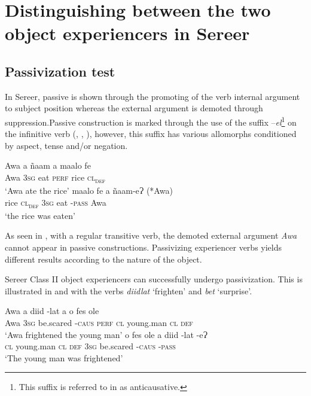 \documentclass[output=paper]{langscibook}
\begin{document}
\section{Distinguishing between the two object  experiencers in Sereer}
\label{sec:tamba:3}
\subsection{Passivization test}
\label{sec:tamba:3.1}

In Sereer, passive is shown through the promoting of the verb internal argument to subject position whereas the external argument is demoted through suppression.Passive construction is marked through the use of the suffix –\textit{el}\footnote{This suffix is referred to in \citet{FayeMous2006} as anticausative.} on the infinitive verb (\citealt{Faye1979}, \citealt{Renaudier2012}, \citealt{Faye2013}), however, this suffix has various allomorphs conditioned by aspect, tense and/or negation.

\ea \label{ex:tamba:8}
\ea \label{ex:tamba:8a}
\gll Awa   a       ñaam   a         maalo fe\\
Awa   3\textsc{sg}   eat      \textsc{perf}    rice     \textsc{cl\textsubscript{def}}\\
\glt `Awa ate the rice'
\ex \label{ex:tamba:8b}
\gll maalo fe     a      ñaam-eɁ       (*Awa)\\
rice    \textsc{cl\textsubscript{def}} 3\textsc{sg}  eat     {}-\textsc{pass}   Awa\\
\glt `the rice was eaten'
\z
\z

As seen in , with a regular transitive verb, the demoted external argument \textit{Awa}  cannot appear in passive constructions. Passivizing experiencer verbs yields different results according to the nature of the object. 

Sereer Class II object experiencers can successfully undergo passivization. This is illustrated in  and  with the verbs \textit{diidlat} ‘frighten’ and \textit{bet} ‘surprise’. 

\ea \label{ex:tamba:9}
\ea \label{ex:tamba:9a}
\gll Awa  a      diid         {}-lat    a       o    fes            ole\\
Awa  \textsc{3sg} be.scared -\textsc{caus}  \textsc{perf}    \textsc{cl} young.man  \textsc{cl\textsubscript{} \textsc{def}}\\
\glt `Awa frightened the young man'
\ex \label{ex:tamba:9b}
\gll o  fes                ole     a      diid         {}-lat    {}-eɁ\\
\textsc{cl} young.man  \textsc{cl\textsubscript{} \textsc{def}}  3\textsc{sg}   be.scared -\textsc{caus}    \textsc{{}-pass}\\
\glt `The young man was frightened'
\z
\z
\end{document}
